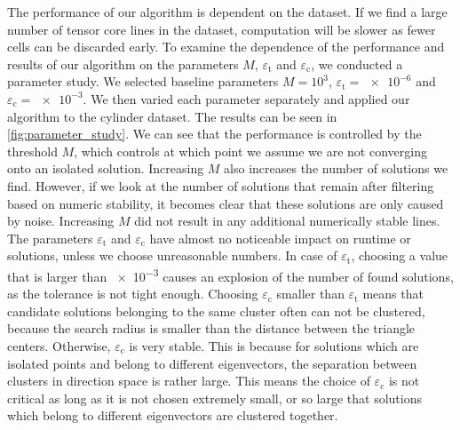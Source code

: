 %
The performance of our algorithm is dependent on the dataset.
%
If we find a large number of tensor core lines in the dataset, computation
will be slower as fewer cells can be discarded early.
%
To examine the dependence of the performance and results of our algorithm on the
parameters $M$, $\varepsilon_{\mathrm{t}}$ and $\varepsilon_{\mathrm{c}}$, we
conducted a parameter study.
%
We selected baseline parameters $M = 10^3$, $\varepsilon_{\mathrm{t}} =
\num{e-6}$ and $\varepsilon_{\mathrm{c}} = \num{e-3}$.
%
We then varied each parameter separately and applied our algorithm to the
cylinder dataset.
%
The results can be seen in \cref{fig:parameter_study}.
%
We can see that the performance is controlled by the threshold $M$, which
controls at which point we assume we are not converging onto an isolated
solution.
%
Increasing $M$ also increases the number of solutions we find.
%
However, if we look at the number of solutions that remain after filtering based
on numeric stability, it becomes clear that these solutions are only caused by
noise.
%
Increasing $M$ did not result in any additional numerically stable lines.
%
The parameters $\varepsilon_{\mathrm{t}}$ and $\varepsilon_{\mathrm{c}}$ have
almost no noticeable impact on runtime or solutions, unless we choose
unreasonable numbers.
%
In case of $\varepsilon_{\mathrm{t}}$, choosing a value that is larger than
\num{e-3} causes an explosion of the number of found solutions, as the
tolerance is not tight enough.
%
Choosing $\varepsilon_{\mathrm{c}}$ smaller than $\varepsilon_{\mathrm{t}}$
means that candidate solutions belonging to the same cluster often can not be
clustered, because the search radius is smaller than the distance between the
triangle centers.
%
Otherwise, $\varepsilon_{\mathrm{c}}$ is very stable.
%
This is because for solutions which are isolated points and belong to different
eigenvectors, the separation between clusters in direction space is rather
large.
This means the choice of $\varepsilon_{\mathrm{c}}$ is not critical as
long as it is not chosen extremely small, or so large that solutions
which belong to different eigenvectors are clustered together.

